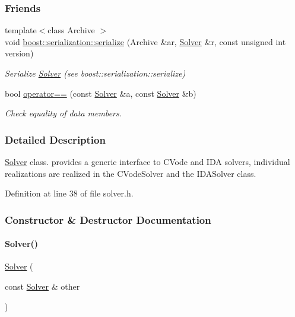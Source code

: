 \subsubsection*{Friends}
\begin{DoxyCompactItemize}
\item 
{\footnotesize template$<$class Archive $>$ }\\void \mbox{\hyperlink{classamici_1_1_solver_af5aefbc0a968aeae501d6d7f753ee2a4}{boost\+::serialization\+::serialize}} (Archive \&ar, \mbox{\hyperlink{classamici_1_1_solver}{Solver}} \&r, const unsigned int version)
\begin{DoxyCompactList}\small\item\em Serialize \mbox{\hyperlink{classamici_1_1_solver}{Solver}} (see boost\+::serialization\+::serialize) \end{DoxyCompactList}\item 
bool \mbox{\hyperlink{classamici_1_1_solver_a252a116a8f94abccc25b2086deb0734b}{operator==}} (const \mbox{\hyperlink{classamici_1_1_solver}{Solver}} \&a, const \mbox{\hyperlink{classamici_1_1_solver}{Solver}} \&b)
\begin{DoxyCompactList}\small\item\em Check equality of data members. \end{DoxyCompactList}\end{DoxyCompactItemize}


\subsubsection{Detailed Description}
\mbox{\hyperlink{classamici_1_1_solver}{Solver}} class. provides a generic interface to C\+Vode and I\+DA solvers, individual realizations are realized in the C\+Vode\+Solver and the I\+D\+A\+Solver class. 

Definition at line 38 of file solver.\+h.



\subsubsection{Constructor \& Destructor Documentation}
\mbox{\label{classamici_1_1_solver_a4676b699f5efede8bee51636bbe8b54a}} 
\paragraph{\texorpdfstring{Solver()}{Solver()}}
{\footnotesize\ttfamily \mbox{\hyperlink{classamici_1_1_solver}{Solver}} (\begin{DoxyParamCaption}\item[{const \mbox{\hyperlink{classamici_1_1_solver}{Solver}} \&}]{other }\end{DoxyParamCaption})}


